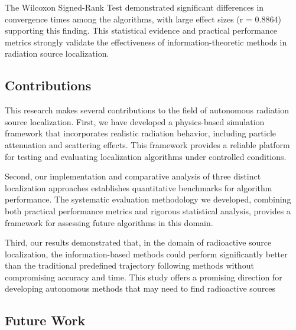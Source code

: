 \documentclass[../report.tex]{subfiles}
\begin{document}
    The Wilcoxon Signed-Rank Test demonstrated significant differences in convergence times among the algorithms, with large effect sizes (r = 0.8864) supporting 
    this finding. This statistical evidence and practical performance metrics strongly validate the effectiveness of information-theoretic methods in radiation 
    source localization.

    \subsection{Contributions}
    \label{sec:conclusions:contributions}

    This research makes several contributions to the field of autonomous radiation source localization. First, we have developed a physics-based 
    simulation framework that incorporates realistic radiation behavior, including particle attenuation and scattering effects. This framework provides a reliable
    platform for testing and evaluating localization algorithms under controlled conditions.

    Second, our implementation and comparative analysis of three distinct localization approaches establishes quantitative benchmarks for algorithm performance. 
    The systematic evaluation methodology we developed, combining both practical performance metrics and rigorous statistical analysis, provides a framework 
    for assessing future algorithms in this domain.

    Third, our results demonstrated that, in the domain of radioactive source localization, the information-based methods could perform significantly better than
    the traditional predefined trajectory following methods without compromising accuracy and time. This study offers a promising direction for developing 
    autonomous methods that may need to find radioactive sources


    \subsection{Future Work}
    \label{sec:conclusions:future_work}
\end{document}
